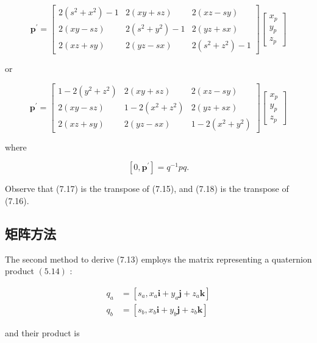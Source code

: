 $$
\mathbf{p}^{\prime}=\left[\begin{array}{ccc}
2\left(s^{2}+x^{2}\right)-1 & 2(x y+s z) & 2(x z-s y) \\
2(x y-s z) & 2\left(s^{2}+y^{2}\right)-1 & 2(y z+s x) \\
2(x z+s y) & 2(y z-s x) & 2\left(s^{2}+z^{2}\right)-1
\end{array}\right]\left[\begin{array}{l}
x_{p} \\
y_{p} \\
z_{p}
\end{array}\right]
$$

or

$$
\mathbf{p}^{\prime}=\left[\begin{array}{ccc}
1-2\left(y^{2}+z^{2}\right) & 2(x y+s z) & 2(x z-s y) \\
2(x y-s z) & 1-2\left(x^{2}+z^{2}\right) & 2(y z+s x) \\
2(x z+s y) & 2(y z-s x) & 1-2\left(x^{2}+y^{2}\right)
\end{array}\right]\left[\begin{array}{l}
x_{p} \\
y_{p} \\
z_{p}
\end{array}\right]
$$

where

$$
\left[0, \mathbf{p}^{\prime}\right]=q^{-1} p q .
$$

Observe that (7.17) is the transpose of (7.15), and (7.18) is the transpose of (7.16).

\subsection{矩阵方法}
The second method to derive (7.13) employs the matrix representing a quaternion product $(5.14)$ :

$$
\begin{aligned}
q_{a} & =\left[s_{a}, x_{a} \mathbf{i}+y_{a} \mathbf{j}+z_{a} \mathbf{k}\right] \\
q_{b} & =\left[s_{b}, x_{b} \mathbf{i}+y_{b} \mathbf{j}+z_{b} \mathbf{k}\right]
\end{aligned}
$$

and their product is

